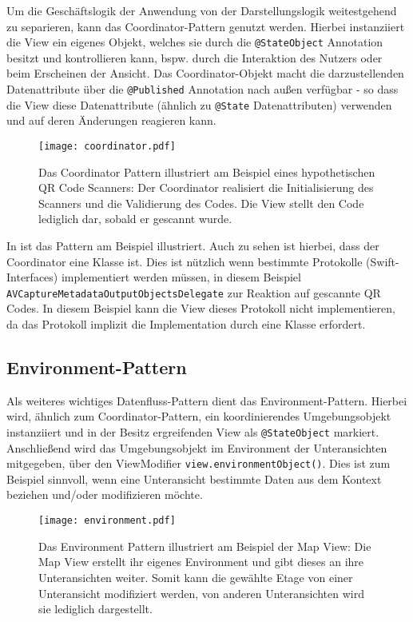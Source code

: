 Um die Geschäftslogik der Anwendung von der Darstellungslogik weitestgehend zu separieren, kann das Coordinator-Pattern genutzt werden. Hierbei instanziiert die View ein eigenes Objekt, welches sie durch die \texttt{@StateObject} Annotation besitzt und kontrollieren kann, bspw. durch die Interaktion des Nutzers oder beim Erscheinen der Ansicht. Das Coordinator-Objekt macht die darzustellenden Datenattribute über die \texttt{@Published} Annotation nach außen verfügbar - so dass die View diese Datenattribute (ähnlich zu \texttt{@State} Datenattributen) verwenden und auf deren Änderungen reagieren kann.

\begin{figure}[H]
\texttt{[image: coordinator.pdf]}
\caption{Das Coordinator Pattern illustriert am Beispiel eines hypothetischen QR Code Scanners: Der Coordinator realisiert die Initialisierung des Scanners und die Validierung des Codes. Die View stellt den Code lediglich dar, sobald er gescannt wurde.}\label{fig:coordinator}
\end{figure}

\noindent In  ist das Pattern am Beispiel illustriert. Auch zu sehen ist hierbei, dass der Coordinator eine Klasse ist. Dies ist nützlich wenn bestimmte Protokolle (Swift-Interfaces) implementiert werden müssen, in diesem Beispiel \texttt{AVCaptureMetadataOutputObjectsDelegate} zur Reaktion auf gescannte QR Codes. In diesem Beispiel kann die View dieses Protokoll nicht implementieren, da das Protokoll implizit die Implementation durch eine Klasse erfordert.

\subsection{Environment-Pattern}

Als weiteres wichtiges Datenfluss-Pattern dient das Environment-Pattern. Hierbei wird, ähnlich zum Coordinator-Pattern, ein koordinierendes Umgebungsobjekt instanziiert und in der Besitz ergreifenden View als \texttt{@StateObject} markiert. Anschließend wird das Umgebungsobjekt im Environment der Unteransichten mitgegeben, über den ViewModifier \texttt{view.environmentObject()}. Dies ist zum Beispiel sinnvoll, wenn eine Unteransicht bestimmte Daten aus dem Kontext beziehen und/oder modifizieren möchte.

\begin{figure}[H]
\texttt{[image: environment.pdf]}
\caption{Das Environment Pattern illustriert am Beispiel der Map View: Die Map View erstellt ihr eigenes Environment und gibt dieses an ihre Unteransichten weiter. Somit kann die gewählte Etage von einer Unteransicht modifiziert werden, von anderen Unteransichten wird sie lediglich dargestellt.}\label{fig:environment}
\end{figure}

